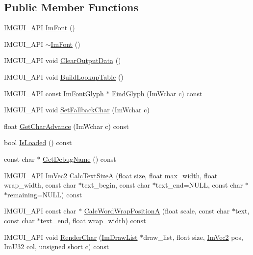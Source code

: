 \subsection*{Public Member Functions}
\begin{DoxyCompactItemize}
\item 
I\+M\+G\+U\+I\+\_\+\+A\+PI \hyperlink{struct_im_font_a1d35b1eb7c2f6a3a648308531e88e7f1}{Im\+Font} ()
\item 
I\+M\+G\+U\+I\+\_\+\+A\+PI \hyperlink{struct_im_font_a377366ed7c5d076363ad4760aeff63ec}{$\sim$\+Im\+Font} ()
\item 
I\+M\+G\+U\+I\+\_\+\+A\+PI void \hyperlink{struct_im_font_aecf7773b1c40b433f91ee245f463de12}{Clear\+Output\+Data} ()
\item 
I\+M\+G\+U\+I\+\_\+\+A\+PI void \hyperlink{struct_im_font_a04b3a1437bd0032722bbbd3613941162}{Build\+Lookup\+Table} ()
\item 
I\+M\+G\+U\+I\+\_\+\+A\+PI const \hyperlink{struct_im_font_glyph}{Im\+Font\+Glyph} $\ast$ \hyperlink{struct_im_font_ac6a773b73c6406fd8f08c4c93213a501}{Find\+Glyph} (Im\+Wchar c) const
\item 
I\+M\+G\+U\+I\+\_\+\+A\+PI void \hyperlink{struct_im_font_a1f504f78cc066db20ea2d688e73a560b}{Set\+Fallback\+Char} (Im\+Wchar c)
\item 
float \hyperlink{struct_im_font_adffcff4e4e2d17455410bd4ba76b42e4}{Get\+Char\+Advance} (Im\+Wchar c) const
\item 
bool \hyperlink{struct_im_font_a97dafa61cc94e84be396d69b0d42b1ce}{Is\+Loaded} () const
\item 
const char $\ast$ \hyperlink{struct_im_font_a11843ed46aaa122264d0da87ffafd627}{Get\+Debug\+Name} () const
\item 
I\+M\+G\+U\+I\+\_\+\+A\+PI \hyperlink{struct_im_vec2}{Im\+Vec2} \hyperlink{struct_im_font_ad67f64fd206ad197f4b93b1a1ae27cfe}{Calc\+Text\+SizeA} (float size, float max\+\_\+width, float wrap\+\_\+width, const char $\ast$text\+\_\+begin, const char $\ast$text\+\_\+end=N\+U\+LL, const char $\ast$$\ast$remaining=N\+U\+LL) const
\item 
I\+M\+G\+U\+I\+\_\+\+A\+PI const char $\ast$ \hyperlink{struct_im_font_a3781bb82a1ceba919cb6c98a398c7a67}{Calc\+Word\+Wrap\+PositionA} (float scale, const char $\ast$text, const char $\ast$text\+\_\+end, float wrap\+\_\+width) const
\item 
I\+M\+G\+U\+I\+\_\+\+A\+PI void \hyperlink{struct_im_font_af602fe8f445ae4142436ee3e6baa3ede}{Render\+Char} (\hyperlink{struct_im_draw_list}{Im\+Draw\+List} $\ast$draw\+\_\+list, float size, \hyperlink{struct_im_vec2}{Im\+Vec2} pos, Im\+U32 col, unsigned short c) const
$$
\end{DoxyCompactItemize}
